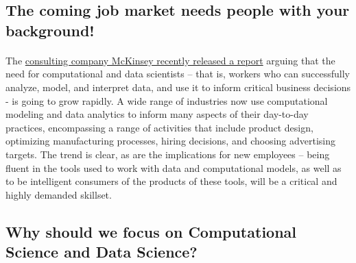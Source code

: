 \documentclass[%
oneside,                 %
final,                   %
10pt]{article}
\begin{document}
\noindent



\subsection{The coming job market needs people with your background!}

\paragraph{}
The \href{{https://www.mckinsey.com/business-functions/mckinsey-analytics/our-insights/the-age-of-analytics-competing-in-a-data-driven-world}}{consulting company McKinsey recently released a report} arguing that the need for computational and data scientists – that is,
workers who can successfully analyze, model, and interpret data, and use it to inform critical business
decisions - is going to grow rapidly. A wide range of industries now use computational
modeling and data analytics to inform many aspects of their day-to-day practices, encompassing
a range of activities that include product design, optimizing manufacturing processes, hiring decisions,
and choosing advertising targets. The trend is clear, as are the implications for new employees
– being fluent in the tools used to work with data and computational models, as well as to be
intelligent consumers of the products of these tools, will be a critical and highly  demanded skillset.



\subsection{Why should we focus on Computational Science and Data Science?}

\end{document}
